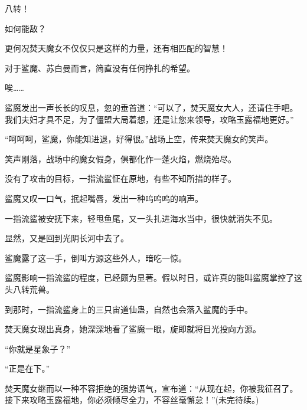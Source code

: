 \begin{this_body}
八转！

如何能敌？

更何况焚天魔女不仅仅只是这样的力量，还有相匹配的智慧！

对于鲨魔、苏白曼而言，简直没有任何挣扎的希望。

唉……

鲨魔发出一声长长的叹息，忽的垂首道：“可以了，焚天魔女大人，还请住手吧。我们夫妇才具不足，为了僵盟大局着想，还是让您来领导，攻略玉露福地更好。”

“呵呵呵，鲨魔，你能知进退，好得很。”战场上空，传来焚天魔女的笑声。

笑声刚落，战场中的魔女假身，俱都化作一蓬火焰，燃烧殆尽。

没有了攻击的目标，一指流鲨怔在原地，有些不知所措的样子。

鲨魔又叹一口气，抿起嘴唇，发出一种呜呜呜的响声。

一指流鲨被安抚下来，轻甩鱼尾，又一头扎进海水当中，很快就消失不见。

显然，又是回到光阴长河中去了。

鲨魔露了这一手，倒叫方源这些外人，暗吃一惊。

鲨魔影响一指流鲨的程度，已经颇为显著。假以时日，或许真的能叫鲨魔掌控了这头八转荒兽。

到那时，一指流鲨身上的三只宙道仙蛊，自然也会落入鲨魔的手中。

焚天魔女现出真身，她深深地看了鲨魔一眼，旋即就将目光投向方源。

“你就是星象子？”

“正是在下。”

焚天魔女继而以一种不容拒绝的强势语气，宣布道：“从现在起，你被我征召了。接下来攻略玉露福地，你必须倾尽全力，不容丝毫懈怠！”(未完待续。)

\end{this_body}


